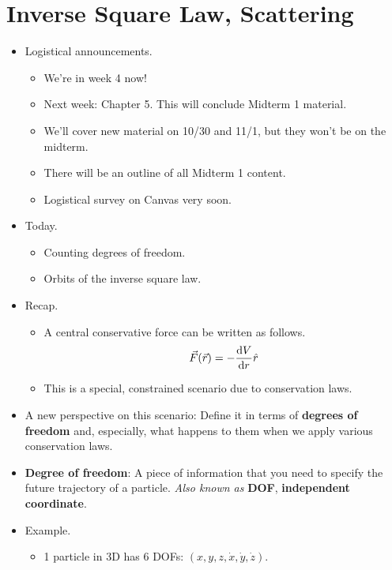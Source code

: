\documentclass[../notes.tex]{subfiles}
\begin{document}
\section{Inverse Square Law, Scattering}
\begin{itemize}
    \item {}Logistical announcements.
    \begin{itemize}
        \item We're in week 4 now!
        \item Next week: Chapter 5. This will conclude Midterm 1 material.
        \item We'll cover new material on 10/30 and 11/1, but they won't be on the midterm.
        \item There will be an outline of all Midterm 1 content.
        \item Logistical survey on Canvas very soon.
    \end{itemize}
    \item Today.
    \begin{itemize}
        \item Counting degrees of freedom.
        \item Orbits of the inverse square law.
    \end{itemize}
    \item Recap.
    \begin{itemize}
        \item A central conservative force can be written as follows.
        \begin{equation*}
            \vec{F}(\vec{r}) = -\dv{V}{r}\hat{r}
        \end{equation*}
        \item This is a special, constrained scenario due to conservation laws.
    \end{itemize}
    \item A new perspective on this scenario: Define it in terms of \textbf{degrees of freedom} and, especially, what happens to them when we apply various conservation laws.
    \item \textbf{Degree of freedom}: A piece of information that you need to specify the future trajectory of a particle. \emph{Also known as} \textbf{DOF}, \textbf{independent coordinate}.
    \item Example.
    \begin{itemize}
        \item 1 particle in 3D has 6 DOFs: $(x,y,z,\dot{x},\dot{y},\dot{z})$.

\end{itemize}
\end{itemize}
\end{document}
